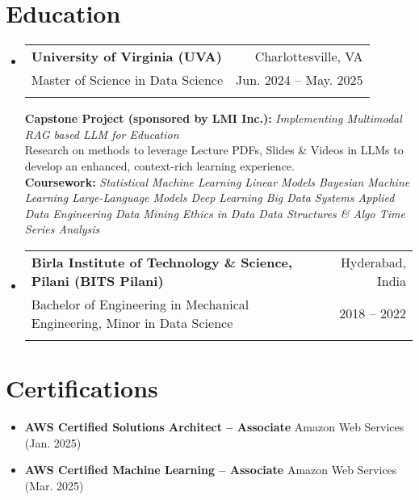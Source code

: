 \documentclass[letter paper,11pt]{article}
\makeatletter
\newcommand{\resumeItem}[1]{
\justifying
\vspace{-2.4px}
  \item\small{
    {#1}
  }
}
\newcommand{\resumeSubheading}[5]{%
  \item
    \begin{tabular*}
    {1\textwidth}
    {l@{\extracolsep{\fill}}r}
      \textbf{#1} & \small#2 \\
      {\small#3} & {\small #4} \\
      {\small#5}
    \end{tabular*}%
  \vspace{-0.95cm}
}
\newcommand{\resumeSubHeadingListStart}{\begin{itemize}[leftmargin=0.0in, label={}]}
\newcommand{\resumeSubHeadingListEnd}{\end{itemize}}
\newcommand{\resumeItemListStart}{\vspace{1pt}\begin{itemize}}
\newcommand{\resumeItemListEnd}{\end{itemize}}
\makeatother
\begin{document}
\section{\large{Education}}
    \resumeSubHeadingListStart
    
    \resumeSubheading
         {University of Virginia (UVA)}{Charlottesville, VA}
        {Master of Science in Data Science}{Jun. 2024 -- May. 2025}{}
        
        \vspace{9pt}
        
        \footnotesize{\textbf{Capstone Project (sponsored by LMI Inc.):} \textsl{Implementing Multimodal RAG based LLM for Education} \\
        {Research on methods to leverage Lecture PDFs, Slides \& Videos in LLMs to develop an enhanced, context-rich learning experience.
        }\\
        \vspace{2px}
        \textbf{Coursework:}
        \textsl{Statistical Machine Learning \textbullet{} 
        Linear Models \textbullet{} 
        Bayesian Machine Learning \textbullet{} 
        Large-Language Models \textbullet{}
        Deep Learning \textbullet{}
        Big Data Systems \textbullet{} 
        Applied Data Engineering \textbullet{}
        Data Mining \textbullet{} 
        Ethics in Data \textbullet{} 
        Data Structures \& Algo \textbullet{}
        Time Series Analysis
        }}

    
    \vspace{3pt}    
    \resumeSubheading
        {\small{Birla Institute of Technology \& Science, Pilani (BITS Pilani)}}{Hyderabad, India}
        {Bachelor of Engineering in Mechanical Engineering, Minor in Data Science}{2018 -- 2022}{}
   

 \resumeSubHeadingListEnd 
%

\section{\large{Certifications}}

\vspace{2px}
\resumeItemListStart
\resumeItem{\textbf{AWS Certified Solutions Architect – Associate}}{Amazon Web Services (Jan. 2025)}
\vspace{-5pt}
\resumeItem{\textbf{AWS Certified Machine Learning – Associate}}{Amazon Web Services (Mar. 2025)}
\resumeItemListEnd
\end{document}
